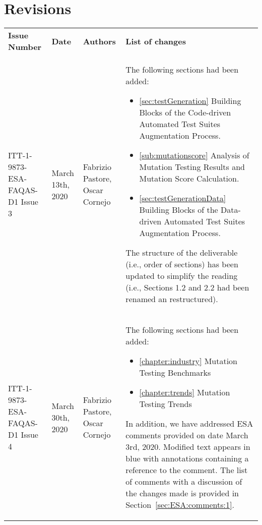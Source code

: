 
\section*{Revisions}
\label{sec:revisions}


\setlength\LTleft{0pt}
\setlength\LTright{0pt}
\tiny 
\begin{longtable}{|p{2cm}|p{1cm}|p{1.5cm}|p{9cm}|@{}}
\label{table:codeoperators} \\
\textbf{Issue Number}&\textbf{Date}&\textbf{Authors}&\textbf{List of changes}\\

ITT-1-9873-ESA-FAQAS-D1
Issue 3&
March 13th, 2020&
Fabrizio Pastore, Oscar Cornejo&
\begin{minipage}{12cm}
The following sections had been added:
\begin{itemize}
\item \ref{sec:testGeneration} Building Blocks of the Code-driven Automated Test Suites Augmentation Process.
\item \ref{sub:mutationscore} Analysis of Mutation Testing Results and Mutation Score Calculation.
\item \ref{sec:testGenerationData} Building Blocks of the Data-driven Automated Test Suites Augmentation Process.
\end{itemize}

The structure of the deliverable (i.e., order of sections) has been updated to simplify the reading (i.e., Sections 1.2 and 2.2 had been renamed an restructured).
\end{minipage}
\\
\hline
ITT-1-9873-ESA-FAQAS-D1
Issue 4
&March 30th, 2020
&Fabrizio Pastore, Oscar Cornejo
&
\begin{minipage}{12cm}
The following sections had been added:

\begin{itemize}
	\item \ref{chapter:industry} Mutation Testing Benchmarks
	\item \ref{chapter:trends} Mutation Testing Trends
\end{itemize}
\end{minipage}
In addition, we have addressed ESA comments provided on date March 3rd, 2020. Modified text appears in blue with annotations containing a reference to the comment. The list of comments with a discussion of the changes made is provided in Section~\ref{sec:ESA:comments:1}.
\\


\end{longtable}
